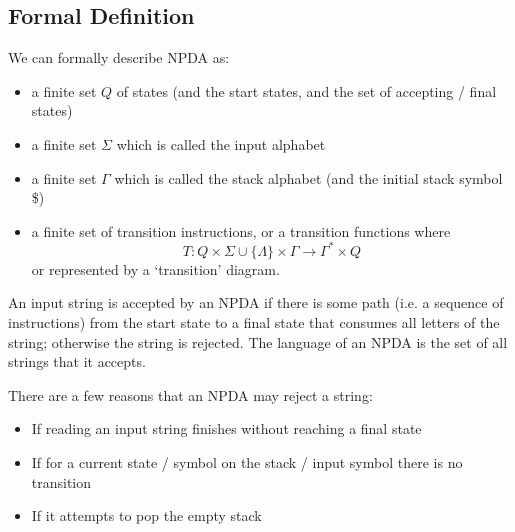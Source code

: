 \subsection{Formal Definition}
We can formally describe NPDA as:
\begin{itemize}
    \item a finite set $Q$ of states (and the start states, and the set of accepting / final states)
    \item a finite set $\Sigma$ which is called the input alphabet
    \item a finite set $\Gamma$ which is called the stack alphabet (and the initial stack symbol \$)
    \item a finite set of transition instructions, or a transition functions where
    \[T:Q \times \Sigma \cup \{\Lambda\} \times \Gamma \rightarrow \Gamma^* \times Q\]
    or represented by a `transition' diagram.
\end{itemize}

An input string is accepted by an NPDA if there is some path (i.e. a sequence of instructions) from the start state to a final state that consumes all letters of the string; otherwise the string is rejected. The language of an NPDA is the set of all strings that it accepts.

There are a few reasons that an NPDA may reject a string:
\begin{itemize}
    \item If reading an input string finishes without reaching a final state 
    \item If for a current state / symbol on the stack / input symbol there is no transition
    \item If it attempts to pop the empty stack
\end{itemize}

